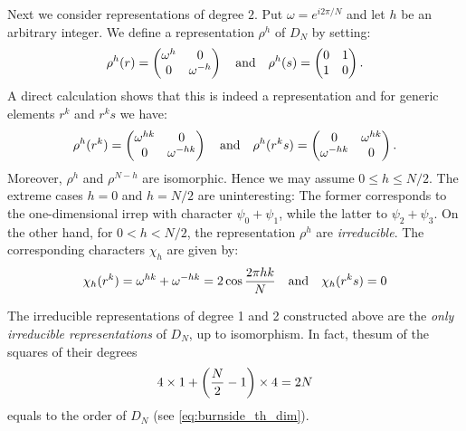 Next we consider representations of degree $2$.
Put $\omega = e^{i 2 \pi / N}$ and let $h$ be an arbitrary integer.
We define a representation $\rho^h$ of $D_N$ by setting:
\begin{equation}
    \rho^h(r) =
    \begin{pmatrix}
        \omega^{h} & 0 \\
        0 & \omega^{-h}
    \end{pmatrix}
    \qand
    \rho^h(s) =
    \begin{pmatrix}
        0 & 1 \\ 1 & 0
    \end{pmatrix}.
    \label{eq:irreps_2d_DN}
\end{equation}
A direct calculation shows that this is indeed a representation and for generic elements $r^k$ and $r^k s$ we have:
\begin{equation}
    \rho^h(r^k) =
    \begin{pmatrix}
        \omega^{hk} & 0 \\
        0 & \omega^{-hk}
    \end{pmatrix}
    \qand
    \rho^h(r^k s) =
    \begin{pmatrix}
        0 & \omega^{hk} \\ \omega^{-hk} & 0
    \end{pmatrix}.
\end{equation}
Moreover, $\rho^h$ and $\rho^{N-h}$ are isomorphic.
Hence we may assume $0 \leq h \leq N/2$.
The extreme cases $h=0$ and $h=N/2$ are uninteresting:
The former corresponds to the one-dimensional irrep with character $\psi_0 + \psi_1$, while the latter to $\psi_2 + \psi_3$.
On the other hand, for $0 < h < N/2$, the representation $\rho^h$ are \emph{irreducible}.
The corresponding characters $\chi_h$ are given by:
\begin{equation}
    \chi_h(r^k) = \omega^{hk} + \omega^{-hk} = 2 \cos \frac{2 \pi hk}{N}
    \qand
    \chi_h(r^k s) = 0
    \label{eq:chars_2d_DN}
\end{equation}

The irreducible representations of degree 1 and 2 constructed above are the \emph{only irreducible representations} of $D_N$, up to isomorphism.
In fact, thesum of the squares of their degrees
\begin{equation*}
    4 \times 1 + \qty( \frac{N}{2} - 1  ) \times 4 = 2N
\end{equation*}
equals to the order of $D_N$ (see \eqref{eq:burnside_th_dim}).




